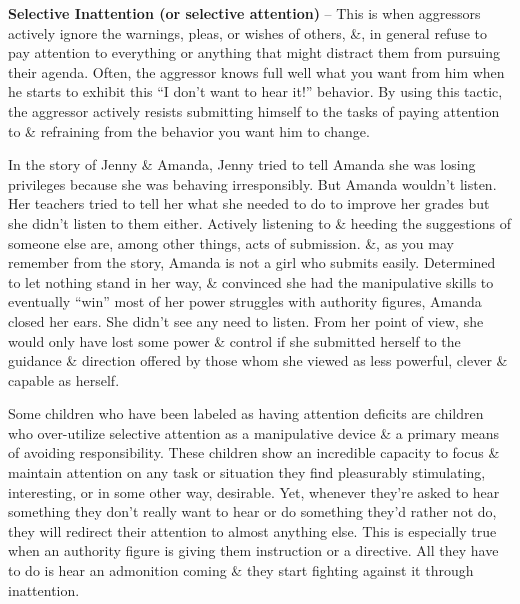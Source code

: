 \documentclass{article}
\numberwithin{equation}{section}
\begin{document}
\textbf{Selective Inattention (or selective attention)} -- This is when aggressors actively ignore the warnings, pleas, or wishes of others, \&, in general refuse to pay attention to everything or anything that might distract them from pursuing their agenda. Often, the aggressor knows full well what you want from him when he starts to exhibit this ``I don't want to hear it!'' behavior. By using this tactic, the aggressor actively resists submitting himself to the tasks of paying attention to \& refraining from the behavior you want him to change.

In the story of Jenny \& Amanda, Jenny tried to tell Amanda she was losing privileges because she was behaving irresponsibly. But Amanda wouldn't listen. Her teachers tried to tell her what she needed to do to improve her grades but she didn't listen to them either. Actively listening to \& heeding the suggestions of someone else are, among other things, acts of submission. \&, as you may remember from the story, Amanda is not a girl who submits easily. Determined to let nothing stand in her way, \& convinced she had the manipulative skills to eventually ``win'' most of her power struggles with authority figures, Amanda closed her ears. She didn't see any need to listen. From her point of view, she would only have lost some power \& control if she submitted herself to the guidance \& direction offered by those whom she viewed as less powerful, clever \& capable as herself.

Some children who have been labeled as having attention deficits are children who over-utilize selective attention as a manipulative device \& a primary means of avoiding responsibility. These children show an incredible capacity to focus \& maintain attention on any task or situation they find pleasurably stimulating, interesting, or in some other way, desirable. Yet, whenever they're asked to hear something they don't really want to hear or do something they'd rather not do, they will redirect their attention to almost anything else. This is especially true when an authority figure is giving them instruction or a directive. All they have to do is hear an admonition coming \& they start fighting against it through inattention.
\end{document}
